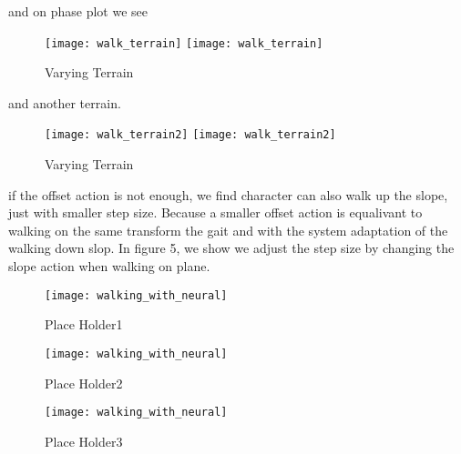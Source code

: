 and on phase plot we see

\begin{figure}[!htbp]
  \begin{center}
    \leavevmode
    \ifpdf
      \texttt{[image: walk\_terrain]}
    \else
      \texttt{[image: walk\_terrain]}
    \fi
    \caption{Varying Terrain}
    \label{fig:diffterrainphase}
\end{center}
\end{figure}

and another terrain.
\begin{figure}[!htbp]
  \begin{center}
    \leavevmode
    \ifpdf
      \texttt{[image: walk\_terrain2]}
    \else
      \texttt{[image: walk\_terrain2]}
    \fi
    \caption{Varying Terrain}
    \label{fig:diffterrainphase}
\end{center}
\end{figure}


if the offset action is not enough, we find character can also walk up the slope, just with smaller step size.
Because a smaller offset action is equalivant to walking on the same transform the gait and with the system adaptation of the walking down slop.
In figure 5, we show we adjust the step size by changing the slope action when walking on plane.

\begin{figure}[!htbp]
  \begin{center}
      \texttt{[image: walking\_with\_neural]}
    \caption{Place Holder1}
    \label{fig:ssp1}
\end{center}
\end{figure}

\begin{figure}[!htbp]
  \begin{center}
      \texttt{[image: walking\_with\_neural]}
    \caption{Place Holder2}
    \label{fig:ssp2}
\end{center}
\end{figure}

\begin{figure}[!htbp]
  \begin{center}
      \texttt{[image: walking\_with\_neural]}
    \caption{Place Holder3}
    \label{fig:ssp3}
\end{center}
\end{figure}




